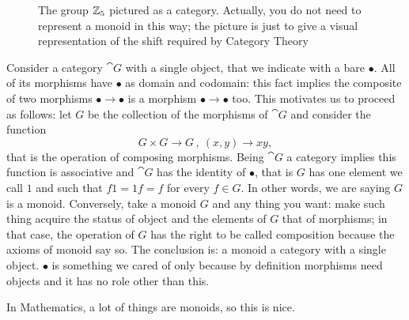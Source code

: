 \begin{example}
\begin{figure}
\centering
{}
\caption{The group \(\mathbb Z_5\) pictured as a category. Actually, you do not need to represent a monoid in this way; the picture is just to give a visual representation of the shift required by Category Theory}
\end{figure}
Consider a category \(\cat G\) with a single object, that we indicate with a bare \(\bullet\). All of its morphisms have \(\bullet\) as domain and codomain: this fact implies the composite of two morphisms \(\bullet \to \bullet\) is a morphism \(\bullet \to \bullet\) too. This motivates us to proceed as follows: let \(G\) be the collection of the morphisms of \(\cat G\) and consider the function
\[G \times G \to G\,,\ (x, y) \to xy ,\]
that is the operation of composing morphisms. Being \(\cat G\) a category implies this function is associative and \(\cat G\) has the identity of \(\bullet\), that is \(G\) has one element we call \(1\) and such that \(f1 = 1f = f\) for every \(f \in G\). In other words, we are saying \(G\) is a monoid.\newline
Conversely, take a monoid \(G\) and any thing you want: make such thing acquire the status of object and the elements of \(G\) that of morphisms; in that case, the operation of \(G\) has the right to be called composition because the axioms of monoid say so.\newline
The conclusion is: a monoid  a category with a single object. \(\bullet\) is something we cared of only because by definition morphisms need objects and it has no role other than this.
\end{example}

In Mathematics, a lot of things are monoids, so this is nice.

